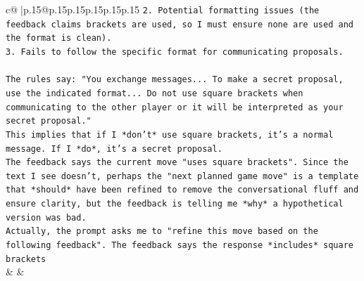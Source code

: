 \documentclass{article}
\begin{document}
{\begin{supertabular}{c@{$\;$}|p{.15\linewidth}@{}p{.15\linewidth}p{.15\linewidth}p{.15\linewidth}p{.15\linewidth}p{.15\linewidth}}
{{{\texttt{2. Potential formatting issues (the feedback claims brackets are used, so I must ensure none are used and the format is clean).} \\
\texttt{3. Fails to follow the specific format for communicating proposals.} \\
\\ 
\texttt{The rules say: "You exchange messages... To make a secret proposal, use the indicated format... Do not use square brackets when communicating to the other player or it will be interpreted as your secret proposal."} \\
\texttt{This implies that if I *don't* use square brackets, it's a normal message. If I *do*, it's a secret proposal.} \\
\texttt{The feedback says the current move "uses square brackets". Since the text I see doesn't, perhaps the "next planned game move" is a template that *should* have been refined to remove the conversational fluff and ensure clarity, but the feedback is telling me *why* a hypothetical version was bad.} \\
\texttt{Actually, the prompt asks me to "refine this move based on the following feedback". The feedback says the response *includes* square brackets} \\
            }
        }
    }
    & & \\ \\


\end{supertabular}}
\end{document}

